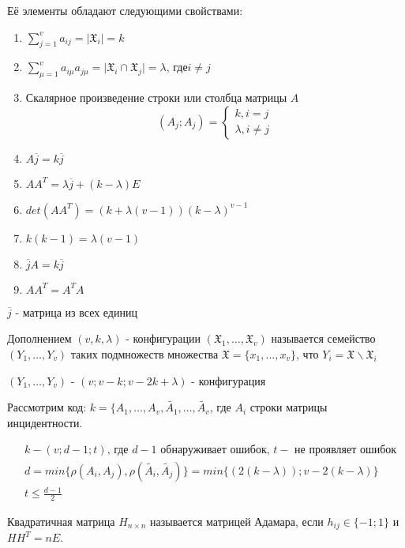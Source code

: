 Её элементы обладают следующими свойствами:
\begin{enumerate}
	\item $\sum_{j=1}^v a_{ij} = \vert \mathfrak{X}_i \vert = k$
	\item $\sum_{\mu=1}^v a_{i\mu}a_{j\mu} = \vert \mathfrak{X}_i \cap \mathfrak{X}_j \vert = \lambda \text{, где} i\neq j$
	\item Скалярное произведение строки или столбца матрицы $A$
	\begin{equation*}
		(A_j; A_j) = 
		\begin{cases}
			k, i = j \\
			\lambda, i \neq j
		\end{cases}
	\end{equation*}
	\item $A\overline{j} = k\overline{j}$
	\item $AA^T = \lambda \overline{j} + (k - \lambda)E$
	\item $det(AA^T) = (k + \lambda(v - 1))(k - \lambda)^{v - 1}$
	\item $k(k - 1) = \lambda(v - 1)$
	\item $\overline{j}A = k\overline{j}$
	\item $AA^T = A^TA$
\end{enumerate}

\prim $\overline{j}$ - матрица из всех единиц

\opr Дополнением $(v, k, \lambda)$ - конфигурации $( \mathfrak{X}_1, \dots, \mathfrak{X}_v)$
называется семейство $(Y_1, \dots, Y_v)$ таких подмножеств множества $\mathfrak{X} = \lbrace x_1, \dots, x_v\rbrace$,
что $Y_i = \mathfrak{X}\backslash\mathfrak{X}_i$

\utv
$(Y_1, \dots, Y_v)$ - $(v; v - k; v - 2k + \lambda)$ - конфигурация

Рассмотрим код:
$k = \lbrace A_1, \dots, A_v,\tilde{A_1}, \dots, \tilde{A_v}$, где $A_i$ строки матрицы инцидентности.

\utv
\begin{align*}
	& k - (v; d - 1; t) \text{, где } d - 1 \text{ обнаруживает ошибок, } t - \text{ не проявляет ошибок}\\
	& d = min\lbrace \rho(A_i, A_j), \rho(\tilde{A_i}, \tilde{A_j})\rbrace = min\lbrace (2(k - \lambda));v - 2(k - \lambda) \rbrace\\
	& t \leq \frac{d - 1}{2}
\end{align*}

\opr
Квадратичная матрица $H_{n\times n}$ называется матрицей Адамара, если $h_{ij} \in \lbrace -1; 1 \rbrace$
и $HH^T = nE$.

